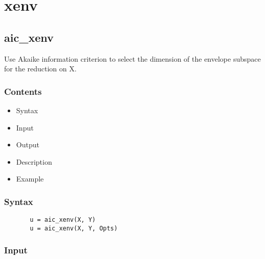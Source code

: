 \documentclass[a4paper,11pt,openany]{memoir}
\begin{document}
\newpage

\chapter{xenv}

\rmfamily
\color{black}\section{aic\_xenv}

\begin{par}
Use Akaike information criterion to select the dimension of the envelope subspace for the reduction on X.
\end{par} \vspace{1em}

\subsection*{Contents}

\begin{itemize}
\setlength{\itemsep}{-1ex}
   \item Syntax
   \item Input
   \item Output
   \item Description
   \item Example
\end{itemize}


\subsection*{Syntax}


\begin{verbatim}       u = aic_xenv(X, Y)
       u = aic_xenv(X, Y, Opts)\end{verbatim}
    

\subsection*{Input}
\end{document}
